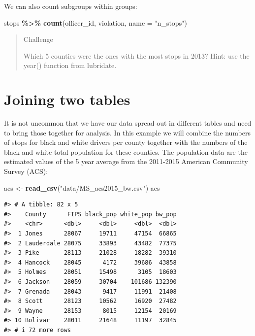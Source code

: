 \documentclass[
]{book}
\newenvironment{Shaded}{\begin{snugshade}}{\end{snugshade}}
\newcommand{\AttributeTok}[1]{\textcolor[rgb]{0.13,0.29,0.53}{#1}}
\newcommand{\FunctionTok}[1]{\textcolor[rgb]{0.13,0.29,0.53}{\textbf{#1}}}
\newcommand{\NormalTok}[1]{#1}
\newcommand{\OtherTok}[1]{\textcolor[rgb]{0.56,0.35,0.01}{#1}}
\newcommand{\SpecialCharTok}[1]{\textcolor[rgb]{0.81,0.36,0.00}{\textbf{#1}}}
\newcommand{\StringTok}[1]{\textcolor[rgb]{0.31,0.60,0.02}{#1}}
\begin{document}
We can also count subgroups within groups:

\begin{Shaded}
\begin{Highlighting}[]
\NormalTok{stops }\SpecialCharTok{\%\textgreater{}\%}
  \FunctionTok{count}\NormalTok{(officer\_id, violation, }\AttributeTok{name =} \StringTok{"n\_stops"}\NormalTok{)}
\end{Highlighting}
\end{Shaded}

\begin{quote}
Challenge

Which 5 counties were the ones with the most stops in 2013?
Hint: use the year() function from lubridate.
\end{quote}

\hypertarget{joining-two-tables}{%
\section{Joining two tables}\label{joining-two-tables}}

It is not uncommon that we have our data spread out in different tables and need to bring those together for analysis. In this example we will combine the numbers of stops for black and white drivers per county together with the numbers of the black and white total population for these counties. The population data are the estimated values of the 5 year average from the 2011-2015 American Community Survey (ACS):

\begin{Shaded}
\begin{Highlighting}[]
\NormalTok{acs }\OtherTok{\textless{}{-}} \FunctionTok{read\_csv}\NormalTok{(}\StringTok{"data/MS\_acs2015\_bw.csv"}\NormalTok{)}
\NormalTok{acs}
\end{Highlighting}
\end{Shaded}

\begin{verbatim}
#> # A tibble: 82 x 5
#>    County      FIPS black_pop white_pop bw_pop
#>    <chr>      <dbl>     <dbl>     <dbl>  <dbl>
#>  1 Jones      28067     19711     47154  66865
#>  2 Lauderdale 28075     33893     43482  77375
#>  3 Pike       28113     21028     18282  39310
#>  4 Hancock    28045      4172     39686  43858
#>  5 Holmes     28051     15498      3105  18603
#>  6 Jackson    28059     30704    101686 132390
#>  7 Grenada    28043      9417     11991  21408
#>  8 Scott      28123     10562     16920  27482
#>  9 Wayne      28153      8015     12154  20169
#> 10 Bolivar    28011     21648     11197  32845
#> # i 72 more rows
\end{verbatim}
\end{document}
